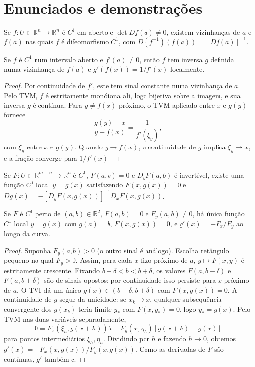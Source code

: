 \documentclass[11pt,a4paper]{article}
\begin{document}
\section{Enunciados e demonstrações}
\begin{teorema}
Se $f:U\subset\mathbb R^n\to\mathbb R^n$ é $C^1$ em aberto e $\det Df(a)\neq0$, existem vizinhanças de $a$ e $f(a)$ nas quais $f$ é difeomorfismo $C^1$, com $D(f^{-1})(f(a))=[Df(a)]^{-1}$.
\end{teorema}
\begin{proposicao}
Se $f$ é $C^1$ num intervalo aberto e $f'(a)\neq0$, então $f$ tem inversa $g$ definida numa vizinhança de $f(a)$ e $g'(f(x))=1/f'(x)$ localmente.
\end{proposicao}
\begin{proof}
Por continuidade de $f'$, este tem sinal constante numa vizinhança de $a$. Pelo TVM, $f$ é estritamente monótona ali, logo bijetiva sobre a imagem, e sua inversa $g$ é contínua. Para $y\ne f(x)$ próximo, o TVM aplicado entre $x$ e $g(y)$ fornece
\[
\frac{g(y)-x}{y-f(x)}=\frac1{f'(\xi_y)},
\]
com $\xi_y$ entre $x$ e $g(y)$. Quando $y\to f(x)$, a continuidade de $g$ implica $\xi_y\to x$, e a fração converge para $1/f'(x)$.
\end{proof}
\begin{teorema}
Se $F:U\subset\mathbb R^{m+n}\to\mathbb R^n$ é $C^1$, $F(a,b)=0$ e $D_yF(a,b)$ é invertível, existe uma função $C^1$ local $y=g(x)$ satisfazendo $F(x,g(x))=0$ e
$Dg(x)=-[D_yF(x,g(x))]^{-1}D_xF(x,g(x))$.
\end{teorema}
\begin{proposicao}
Se $F$ é $C^1$ perto de $(a,b)\in\mathbb R^2$, $F(a,b)=0$ e $F_y(a,b)\ne0$, há única função $C^1$ local $y=g(x)$ com $g(a)=b$, $F(x,g(x))=0$, e $g'(x)=-F_x/F_y$ ao longo da curva.
\end{proposicao}
\begin{proof}
Suponha $F_y(a,b)>0$ (o outro sinal é análogo). Escolha retângulo pequeno no qual $F_y>0$. Assim, para cada $x$ fixo próximo de $a$, $y\mapsto F(x,y)$ é estritamente crescente. Fixando $b-\delta<b<b+\delta$, os valores $F(a,b-\delta)$ e $F(a,b+\delta)$ são de sinais opostos; por continuidade isso persiste para $x$ próximo de $a$. O TVI dá um único $g(x)\in(b-\delta,b+\delta)$ com $F(x,g(x))=0$. A continuidade de $g$ segue da unicidade: se $x_k\to x$, qualquer subsequência convergente dos $g(x_k)$ teria limite $y_*$ com $F(x,y_*)=0$, logo $y_*=g(x)$. Pelo TVM nas duas variáveis separadamente,
\[
0=F_x(\xi_h,g(x+h))h+
F_y(x,\eta_h)[g(x+h)-g(x)]
\]
para pontos intermediários $\xi_h,\eta_h$. Dividindo por $h$ e fazendo $h\to0$, obtemos $g'(x)=-F_x(x,g(x))/F_y(x,g(x))$. Como as derivadas de $F$ são contínuas, $g'$ também é.
\end{proof}
\end{document}

